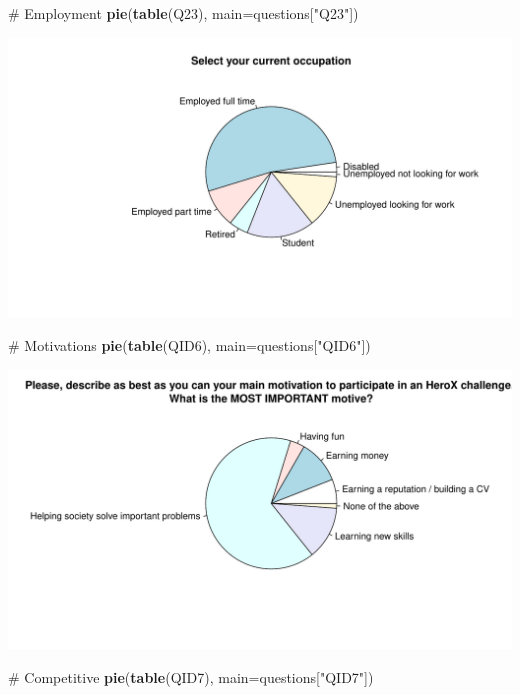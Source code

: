 \documentclass[12pt, titlepage]{article}
\newenvironment{Shaded}{\begin{snugshade}}{\end{snugshade}}
\newcommand{\KeywordTok}[1]{\textcolor[rgb]{0.12,0.11,0.11}{\textbf{#1}}}
\newcommand{\DataTypeTok}[1]{\textcolor[rgb]{0.00,0.34,0.68}{#1}}
\newcommand{\StringTok}[1]{\textcolor[rgb]{0.75,0.01,0.01}{#1}}
\newcommand{\CommentTok}[1]{\textcolor[rgb]{0.54,0.53,0.53}{#1}}
\newcommand{\NormalTok}[1]{\textcolor[rgb]{0.12,0.11,0.11}{#1}}
\begin{document}
\begin{Shaded}
\begin{Highlighting}[]
\CommentTok{# Employment}
\KeywordTok{pie}\NormalTok{(}\KeywordTok{table}\NormalTok{(Q23), }\DataTypeTok{main=}\NormalTok{questions[}\StringTok{"Q23"}\NormalTok{])}
\end{Highlighting}
\end{Shaded}

\includegraphics{analysis_survey_files/figure-latex/unnamed-chunk-2-5.pdf}

\begin{Shaded}
\begin{Highlighting}[]
\CommentTok{# Motivations}
\KeywordTok{pie}\NormalTok{(}\KeywordTok{table}\NormalTok{(QID6), }\DataTypeTok{main=}\NormalTok{questions[}\StringTok{"QID6"}\NormalTok{])}
\end{Highlighting}
\end{Shaded}

\includegraphics{analysis_survey_files/figure-latex/unnamed-chunk-2-6.pdf}

\begin{Shaded}
\begin{Highlighting}[]
\CommentTok{# Competitive}
\KeywordTok{pie}\NormalTok{(}\KeywordTok{table}\NormalTok{(QID7), }\DataTypeTok{main=}\NormalTok{questions[}\StringTok{"QID7"}\NormalTok{])}
\end{Highlighting}
\end{Shaded}
\end{document}
